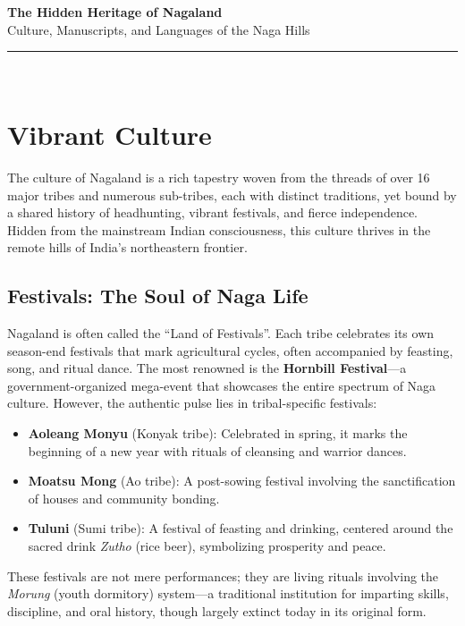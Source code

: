 \documentclass{article}
\begin{document}
\begin{center}
    {\huge \textbf{The Hidden Heritage of Nagaland}} \\[0.5cm]
    {\large Culture, Manuscripts, and Languages of the Naga Hills} \\[0.3cm]
    \rule{0.8\textwidth}{0.5pt} \\[0.3cm]
\end{center}

\section{Vibrant Culture}
The culture of Nagaland is a rich tapestry woven from the threads of over 16 major tribes and numerous sub-tribes, each with distinct traditions, yet bound by a shared history of headhunting, vibrant festivals, and fierce independence. Hidden from the mainstream Indian consciousness, this culture thrives in the remote hills of India's northeastern frontier.

\subsection{Festivals: The Soul of Naga Life}
Nagaland is often called the ``Land of Festivals''. Each tribe celebrates its own season-end festivals that mark agricultural cycles, often accompanied by feasting, song, and ritual dance. The most renowned is the \textbf{Hornbill Festival}—a government-organized mega-event that showcases the entire spectrum of Naga culture. However, the authentic pulse lies in tribal-specific festivals:
\begin{itemize}
    \item \textbf{Aoleang Monyu} (Konyak tribe): Celebrated in spring, it marks the beginning of a new year with rituals of cleansing and warrior dances.
    \item \textbf{Moatsu Mong} (Ao tribe): A post-sowing festival involving the sanctification of houses and community bonding.
    \item \textbf{Tuluni} (Sumi tribe): A festival of feasting and drinking, centered around the sacred drink \textit{Zutho} (rice beer), symbolizing prosperity and peace.
\end{itemize}
These festivals are not mere performances; they are living rituals involving the \textit{Morung} (youth dormitory) system—a traditional institution for imparting skills, discipline, and oral history, though largely extinct today in its original form.
\end{document}
